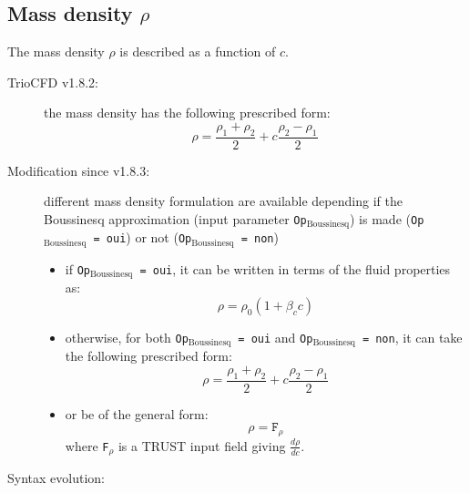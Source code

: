 \subsection{Mass density $\rho$} 
The mass density $\rho$ is described as a function of $c$.

\begin{description}
 \item[TrioCFD v1.8.2:] the mass density has the following prescribed form:
 \begin{equation}
  \displaystyle \rho = \frac{\rho_1+\rho_2}{2}+c\frac{\rho_2-\rho_1}{2}
 \end{equation}

 \item[Modification since v1.8.3:] different mass density formulation are available depending if the Boussinesq approximation (input parameter \texttt{Op$_{\text{Boussinesq}}$}) is made (\texttt{Op$_{\text{Boussinesq}}$ = oui}) or not (\texttt{Op$_{\text{Boussinesq}}$ = non})
 
 \begin{itemize}
 
 \item if \texttt{Op$_{\text{Boussinesq}}$ = oui}, it can be written in terms of the fluid properties as:
  \begin{equation}
   \rho = \rho_0 \left( 1 + \beta_c c\right)
  \end{equation}

  \item otherwise, for both \texttt{Op$_{\text{Boussinesq}}$ = oui}  and \texttt{Op$_{\text{Boussinesq}}$ = non}, it can take the following prescribed form:
  \begin{equation}
   \rho = \frac{\rho_1+\rho_2}{2}+c\frac{\rho_2-\rho_1}{2}
  \end{equation}

 \item or be of the general form:
  \begin{equation}
  \rho = \texttt{F}_\rho
  \end{equation}
  where \texttt{F}$_\rho$ is a TRUST input field giving $\frac{d\rho}{dc}$.
 \end{itemize}

 \item[Syntax evolution:]
\end{description}
~\newline
